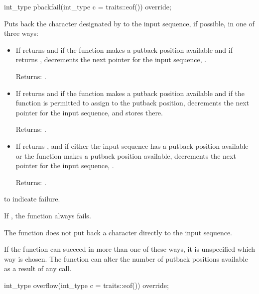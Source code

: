 %
\begin{itemdecl}
int_type pbackfail(int_type c = traits::eof()) override;
\end{itemdecl}

\begin{itemdescr}
\pnum
\effects
Puts back the character designated by  to the input
sequence, if possible, in one of three ways:
\begin{itemize}
\item
If
returns
and
if the function makes a putback position available
and if
returns
,
decrements the next pointer for the input sequence,
.

Returns:
.

\item
If
returns
and
if the function makes a putback position available
and if the function is permitted to assign to the putback position,
decrements the next pointer for the input sequence,
and stores  there.

Returns:
.

\item
If
returns
,
and if either the input sequence has a putback position available or
the function makes a putback position available,
decrements the next pointer for the input sequence,
.

Returns:
.
\end{itemize}

\pnum
\returns
{}
to indicate failure.

\pnum
\remarks
If
,
the function always fails.

\pnum
The function does not put back a character directly to the input sequence.

\pnum
If the function can succeed in more than one of these ways, it is
unspecified which way is chosen.
The function can alter the number of putback positions available as a result of any call.
\end{itemdescr}

%
\begin{itemdecl}
int_type overflow(int_type c = traits::eof()) override;
\end{itemdecl}

